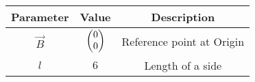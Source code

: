 \begin{tabular}{|c|c|c|}
\hline
\textbf{Parameter} & \textbf{Value} & \textbf{Description} \\
\hline
	$\vec{B}$ & $\begin{pmatrix}0\\0\end{pmatrix}$ & Reference point at Origin \\
\hline
    $l$ & $6$ & Length of a side \\
\hline
\end{tabular}
